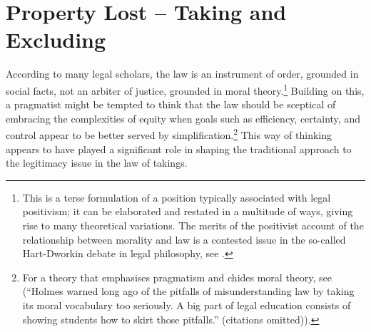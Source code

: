 \section{Property Lost -- Taking and Excluding}\label{sec:7:1}


According to many legal scholars, the law is an instrument of order, grounded in social facts, not an arbiter of justice, grounded in moral theory.\footnote{This is a terse formulation of a position typically associated with legal positivism; it can be elaborated and restated in a multitude of ways, giving rise to many theoretical variations. The merits of the positivist account of the relationship between morality and law is a contested issue in the so-called Hart-Dworkin debate in legal philosophy, see \cite{hart12,dworkin86,shapiro07}.} Building on this, a pragmatist might be tempted to think that the law should be sceptical of embracing the complexities of equity when goals such as efficiency,  certainty, and control appear to be better served by simplification.\footnote{For a theory that emphasises pragmatism and chides moral theory, see \cite[109-110]{posner99} (``Holmes warned long ago of the pitfalls of misunderstanding law by taking its moral vocabulary too seriously. A big part of legal education consists of showing students how to skirt those pitfalls.'' (citations omitted)).} This way of thinking appears to have played a significant role in shaping the traditional approach to the legitimacy issue in the law of takings.


